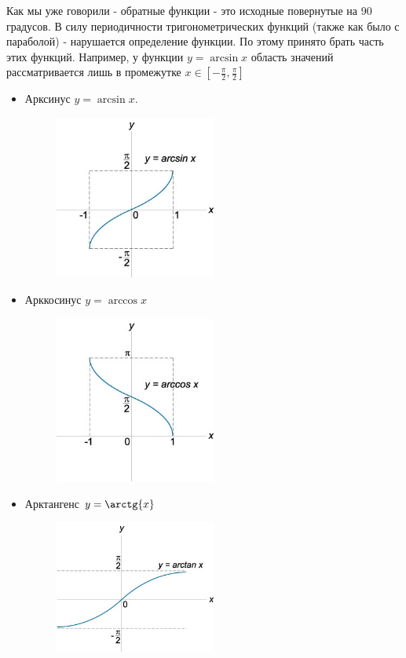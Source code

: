Как мы уже говорили - обратные функции - это исходные повернутые на 90 градусов. В силу периодичности тригонометрических функций (также как было с параболой) - нарушается определение функции. По этому принято брать часть этих функций.  Например, у функции 
$y = \arcsin{x}$ область значений рассматривается лишь в промежутке $x \in [-\frac{\pi}{2},\frac{\pi}{2}]$

\begin{itemize}
    \item Арксинус $y = \arcsin{x}$. 
    \begin{figure}[h!]
    \centering
    \includegraphics[width=0.5\textwidth]{img/arcsin.jpg}
    \end{figure}
    \item Арккосинус $y = \arccos{x}$
    \begin{figure}[h!]
    \centering
    \includegraphics[width=0.5\textwidth]{img/arccos.jpg}
    \end{figure}
    \newpage
    \item Арктангенс $y = \arctg{x}$
    \begin{figure}[h!]
    \centering
    \includegraphics[width=0.5\textwidth]{img/arctg.jpg}

\end{figure}
\end{itemize}

